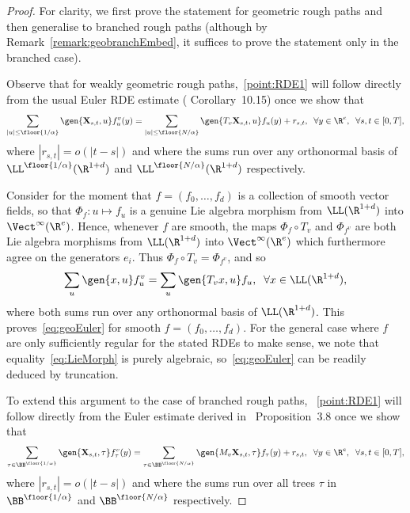 \documentclass{article}
\begin{document}
\begin{proof}
For clarity, we first prove the statement for geometric rough paths and then generalise to branched rough paths (although by Remark~\ref{remark:geobranchEmbed}, it suffices to prove the statement only in the branched case). 

Observe that for weakly geometric rough paths,~\ref{point:RDE1} will follow directly from the usual Euler RDE estimate (\cite{FrizVictoir10} Corollary~10.15)
once we show that
\begin{equation}\label{eq:geoEuler}
\sum_{|u| \leq \floor{1/\alpha}} \gen{\mathbf{X}_{s,t},u} f^v_u(y) = \sum_{|u| \leq \floor{N/\alpha}} \gen{T_v \mathbf{X}_{s,t}, u} f_u(y) + r_{s,t}, \; \; \forall y \in \R^e, \; \; \forall s,t \in [0,T],
\end{equation}
where $|r_{s,t}| = o(|t-s|)$ and where the sums run over any orthonormal basis of $\LL^{\floor{1/\alpha}}(\R^{1+d})$ and $\LL^{\floor{N/\alpha}}(\R^{1+d})$ respectively.

Consider for the moment that $f = (f_0,\ldots, f_d)$ is a collection of smooth vector fields, so that $\Phi_f : u \mapsto f_u$
is a genuine Lie algebra morphism from $\LL(\R^{1+d})$ into $\Vect^\infty(\R^e)$. Hence, whenever $f$ are smooth, the maps $\Phi_f \circ T_v$ and $\Phi_{f^v}$ are both Lie algebra morphisms from $\LL(\R^{1+d})$ into $\Vect^\infty(\R^e)$ which furthermore agree on the generators $e_i$. Thus $\Phi_f \circ T_v = \Phi_{f^v}$, and so
\begin{equation}\label{eq:LieMorph}
\sum_{u} \gen{x,u}f^v_u = \sum_{u} \gen{T_v x,u}f_u, \; \; \forall x \in \LL(\R^{1+d}),
\end{equation}
where both sums run over any orthonormal basis of $\LL(\R^{1+d})$. This proves~\eqref{eq:geoEuler} for smooth $f = (f_0,\ldots, f_d)$. For the general case where $f$ are only sufficiently regular for the stated RDEs to make sense, we note that equality~\eqref{eq:LieMorph} is purely algebraic, so~\eqref{eq:geoEuler} can be readily deduced by truncation.


To extend this argument to the case of branched rough paths, ~\ref{point:RDE1} will follow directly from the Euler estimate derived in~\cite{HairerKelly15} Proposition~3.8 once we show that
\begin{equation}\label{eq:Euler}
\sum_{\tau \in \BB^{\floor{1/\alpha}}} \gen{\mathbf{X}_{s,t},\tau} f^v_\tau(y) = \sum_{\tau \in \BB^{\floor{N/\alpha}}} \gen{M_v \mathbf{X}_{s,t},\tau} f_\tau(y) + r_{s,t}, \; \; \forall y \in \R^e, \; \; \forall s,t \in [0,T],
\end{equation}
where $|r_{s,t}| = o(|t-s|)$ and where the sums run over all trees $\tau$ in $\BB^{\floor{1/\alpha}}$ and $\BB^{\floor{N/\alpha}}$ respectively.


\end{proof}
\end{document}
